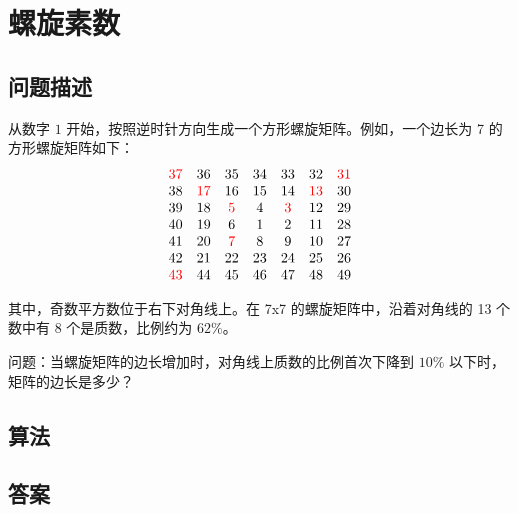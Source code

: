 \section{螺旋素数}
\subsection{问题描述}
\begin{tcolorbox}
	从数字 $1$ 开始，按照逆时针方向生成一个方形螺旋矩阵。例如，一个边长为 7 的方形螺旋矩阵如下：
	\[
		\begin{matrix}
			\textcolor{red}{37} & 36       & 35      & 34 & 33      & 32       & \textcolor{red}{31} \\
			38       & \textcolor{red}{17} & 16      & 15 & 14      & \textcolor{red}{13} & 30       \\
			39       & 18       & \textcolor{red}{5} & 4  & \textcolor{red}{3} & 12       & 29       \\
			40       & 19       & 6       & 1  & 2       & 11       & 28       \\
			41       & 20       & \textcolor{red}{7} & 8  & 9       & 10       & 27       \\
			42       & 21       & 22      & 23 & 24      & 25       & 26       \\
			\textcolor{red}{43} & 44       & 45      & 46 & 47      & 48       & 49       \\
		\end{matrix}
	\]

	其中，奇数平方数位于右下对角线上。在 7x7 的螺旋矩阵中，沿着对角线的 13 个数中有 8 个是质数，比例约为 $62\%$。

	问题：当螺旋矩阵的边长增加时，对角线上质数的比例首次下降到 $10\%$ 以下时，矩阵的边长是多少？
\end{tcolorbox}

\subsection{算法}

\subsection{答案}
